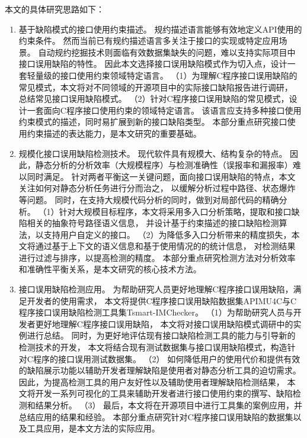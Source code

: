 本文的具体研究思路如下：
\begin{enumerate}
	\item {\kaishu 基于缺陷模式的接口使用约束描述。}
	规约描述语言能够有效地定义API使用的约束条件。
	然而当前已有规约描述语言多关注于接口的实现或特定应用场景。
	自动规约挖掘技术则面临有效数据集缺失的问题，难以支持实际项目中接口误用缺陷的特性。
	因此本文选择接口误用缺陷模式作为切入点，设计一套轻量级的接口使用约束领域特定语言。
	（1）为理解C程序接口误用缺陷的常见模式，本文将对不同领域的开源项目中的实际接口缺陷报告进行调研，
	总结常见接口误用缺陷模式。
	（2）针对C程序接口误用缺陷的常见模式，设计一套面向C程序接口使用约束的领域特定语言。
	该语言应支持多种接口使用约束模式的描述，同时易扩展到新的接口缺陷类型。
	本部分重点研究接口使用约束描述的表达能力，是本文研究的重要基础。
	
	\item {\kaishu 规模化接口误用缺陷检测技术。}
	现代软件具有规模大、结构复杂的特点。
	因此，静态分析的分析效率（大规模程序）与检测准确性（误报率和漏报率）难以同时满足。
	针对两者平衡这一关键问题，面向接口误用缺陷的特点，本文关注如何对静态分析任务进行分而治之，
	以缓解分析过程中路径、状态爆炸等问题。
	同时，在支持大规模代码分析的同时，做到对局部代码的精确分析。
	（1）针对大规模目标程序，本文将采用多入口分析策略，提取和接口缺陷相关的抽象符号路径语义信息，
	并设计基于约束描述的接口缺陷检测算法，以支持用户自定义的接口。
	（2）为降低多入口分析带来的精度损失，本文将通过基于上下文的语义信息和基于使用情况的的统计信息，
	对检测结果进行过滤与排序，以提高检测的精度。
	本部分重点研究检测方法对分析效率和准确性平衡关系，是本文研究的核心技术方法。
	
	\item {\kaishu 接口误用缺陷检测应用。}
	为帮助研究人员更好地理解C程序接口误用缺陷，满足开发者的使用需求，
	本文将提供C程序接口误用缺陷数据集APIMU4C与C程序接口误用缺陷检测工具集Tsmart-IMChecker。
	（1）为帮助研究人员与开发者更好地理解C程序接口误用缺陷，
	本文将对接口误用缺陷模式调研中的实例进行总结。
	同时，为更好地评估现有接口缺陷检测工具的能力与引导新的检测技术的开发，
	本文将结合现有测试数据集与接口误用缺陷模式，构造针对C程序的接口误用测试数据集。
	（2）
	如何降低用户的使用代价和提供有效的缺陷展示功能以辅助开发者理解缺陷是使用者对静态分析工具的迫切需求。
	因此，为提高检测工具的用户友好性以及辅助使用者理解缺陷检测结果，
	本文将开发一系列可视化的工具来辅助开发者进行接口使用约束的撰写、缺陷检测和结果分析。
	（3）
	最后，本文将在开源项目中进行工具集的案例应用，并总结应用的结果和经验。
	本部分重点研究针对C程序接口误用缺陷的数据集以及工具应用，是本文方法的实际应用。
\end{enumerate}




